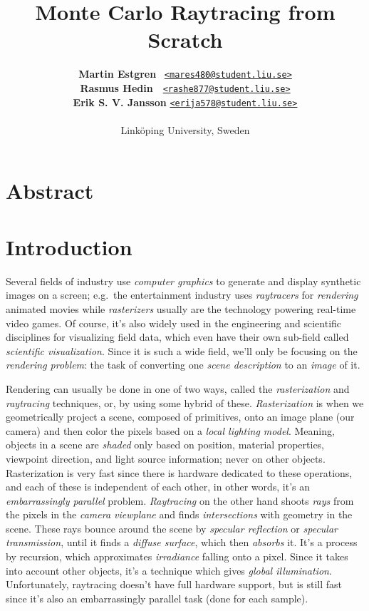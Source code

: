 \documentclass[a4paper, twocolumn]{article}
\title{\LARGE{\textbf{Monte Carlo Raytracing from Scratch}}}
\author{{\textbf{Martin Estgren}} \;\;\;\;\;\;\;\;\;\;\;\;\;\,   {\href{mailto:mares480@student.liu.se}
                                                                 {\texttt{<mares480@student.liu.se>}}} \\
        {\textbf{Rasmus Hedin}} \;\;\;\;\;\;\;\;\;\;\;\;\;\;\,\, {\href{mailto:rashe877@student.liu.se}
                                                                 {\texttt{<rashe877@student.liu.se>}}} \\
        {\textbf{Erik S. V. Jansson}} \;\;\;\;\;\;\;\;           {\href{mailto:erija578@student.liu.se}
                                                                 {\texttt{<erija578@student.liu.se>}}} \\~\\
        {Linköping University, Sweden}\vspace{-1.0ex}}
\begin{document}
    \maketitle
    \section*{Abstract}

    \newpage \tableofcontents \clearpage

    \section{Introduction} \label{sec:introduction}

        Several fields of industry use \emph{computer graphics} to generate and display synthetic images on a screen; e.g.\ the entertainment industry uses \emph{raytracers} for \emph{rendering} animated movies while \emph{rasterizers} usually are the technology powering real-time video games. Of course, it's also widely used in the engineering and scientific disciplines for visualizing field data, which even have their own sub-field called \emph{scientific visualization}. Since it is such a wide field, we'll only be focusing on the \emph{rendering problem}: the task of converting one \emph{scene description} to an \emph{image} of it.

        Rendering can usually be done in one of two ways, called the \emph{rasterization} and \emph{raytracing} techniques, or, by using some hybrid of these. \emph{Rasterization} is when we geometrically project a scene, composed of primitives, onto an image plane (our camera) and then color the pixels based on a \emph{local lighting model}. Meaning, objects in a scene are \emph{shaded} only based on position, material properties, viewpoint direction, and light source information; never on other objects. Rasterization is very fast since there is hardware dedicated to these operations, and each of these is independent of each other, in other words, it's an \emph{embarrassingly parallel} problem. \emph{Raytracing} on the other hand shoots \emph{rays} from the pixels in the \emph{camera viewplane} and finds \emph{intersections} with geometry in the scene. These rays bounce around the scene by \emph{specular reflection} or \emph{specular transmission}, until it finds a \emph{diffuse surface}, which then \emph{absorbs} it. It's a process by recursion, which approximates \emph{irradiance} falling onto a pixel. Since it takes into account other objects, it's a technique which gives \emph{global illumination}. Unfortunately, raytracing doesn't have full hardware support, but is still fast since it's also an embarrassingly parallel task (done for each sample).
\end{document}
